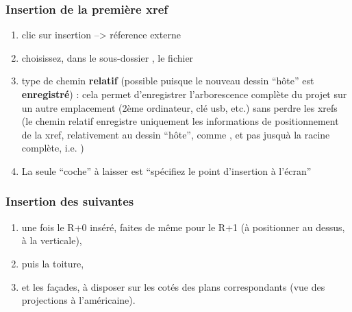 \documentclass[a4paper,12pt,french]{sphinxmanual}
\begin{document}
\subsubsection{Insertion de la première xref}
\label{init_su+acad/004_acad1:insertion-de-la-premiere-xref}\begin{enumerate}
\item {} 
clic sur insertion --\textgreater{} réference externe

\item {} 
choisissez, dans le sous-dossier ,  le fichier 

\item {} 
type de chemin \textbf{relatif} (possible puisque le nouveau dessin ``hôte'' est \textbf{enregistré}) : cela permet d'enregistrer l'arborescence complète du projet sur un autre emplacement (2ème ordinateur, clé usb, etc.) sans perdre les xrefs (le chemin relatif enregistre uniquement les informations de positionnement de la xref, relativement au dessin ``hôte'', comme , et pas jusquà la racine complète, i.e.  )

\item {} 
La seule ``coche'' à laisser est ``spécifiez le point d'insertion à l'écran''

\end{enumerate}


\subsubsection{Insertion des suivantes}
\label{init_su+acad/004_acad1:insertion-des-suivantes}\begin{enumerate}
\item {} 
une fois le R+0 inséré, faites de même pour le R+1 (à positionner au dessus, à la verticale),

\item {} 
puis la toiture,

\item {} 
et les façades, à disposer sur les cotés des plans correspondants (vue des projections à l'américaine).

\end{enumerate}
\end{document}

